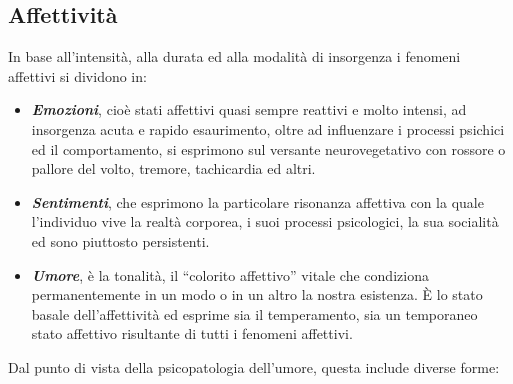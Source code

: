 \subsection{Affettività}

In base all'intensità, alla durata ed alla modalità di insorgenza i
fenomeni affettivi si dividono in:

\begin{itemize}
\item
  \textbf{\emph{Emozioni}}, cioè stati affettivi quasi sempre reattivi e
  molto intensi, ad insorgenza acuta e rapido esaurimento, oltre ad
  influenzare i processi psichici ed il comportamento, si esprimono sul
  versante neurovegetativo con rossore o pallore del volto, tremore,
  tachicardia ed altri.
\end{itemize}

\begin{itemize}
\item
  \textbf{\emph{Sentimenti}}, che esprimono la particolare risonanza
  affettiva con la quale l'individuo vive la realtà corporea, i suoi
  processi psicologici, la sua socialità ed sono piuttosto persistenti.
\item
  \textbf{\emph{Umore}}, è la tonalità, il ``colorito affettivo'' vitale
  che condiziona permanentemente in un modo o in un altro la nostra
  esistenza. È lo stato basale dell'affettività ed esprime sia il
  temperamento, sia un temporaneo stato affettivo risultante di tutti i
  fenomeni affettivi.
\end{itemize}

Dal punto di vista della psicopatologia dell'umore, questa include
diverse forme:

